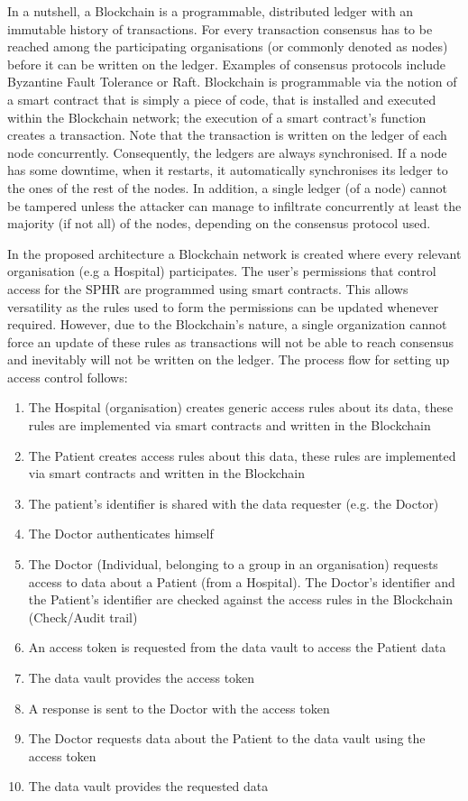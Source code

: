 In a nutshell, a Blockchain is a programmable, distributed ledger with an immutable history of transactions. 
For every transaction consensus has to be reached among the participating organisations (or commonly denoted as nodes) before it can be written on the ledger. Examples of consensus protocols include Byzantine Fault Tolerance or Raft. Blockchain is programmable via the notion of a smart contract that is simply a piece of code, that is installed and executed within the Blockchain network; the execution of a smart contract's function creates a transaction. Note that the transaction is written on the ledger of each node concurrently. Consequently, the ledgers are always synchronised. If a node has some downtime, when it restarts, it automatically synchronises its ledger to the ones of the rest of the nodes. In addition, a single ledger (of a node) cannot be tampered unless the attacker can manage to infiltrate concurrently at least the majority (if not all) of the nodes, depending on the consensus protocol used.

In the proposed architecture a Blockchain network is created where every relevant organisation (e.g a Hospital) participates. The user's permissions that control access for the SPHR are programmed using smart contracts. This allows versatility as the rules used to form the permissions can be updated whenever required. However, due to the Blockchain's nature, a single organization cannot force an update of these rules as transactions will not be able to reach consensus and inevitably will not be written on the ledger.
The process flow for setting up access control follows:
\begin{enumerate}
    \item The Hospital (organisation) creates generic access rules about its data, these rules are implemented via smart contracts and written in the Blockchain
    \item The Patient creates access rules about this data, these rules are implemented via smart contracts and written in the Blockchain
    \item The patient's identifier is shared with the data requester (e.g. the Doctor)
    \item The Doctor authenticates himself
    \item The Doctor (Individual, belonging to a group in an organisation) requests access to data about a Patient (from a Hospital). The Doctor's identifier and the Patient's identifier are checked against the access rules in the Blockchain (Check/Audit trail)
    \item An access token is requested from the data vault to access the Patient data
    \item The data vault provides the access token
    \item A response is sent to the Doctor with the access token
    \item The Doctor requests data about the Patient to the data vault using the access token
    \item The data vault provides the requested data 
\end{enumerate}

